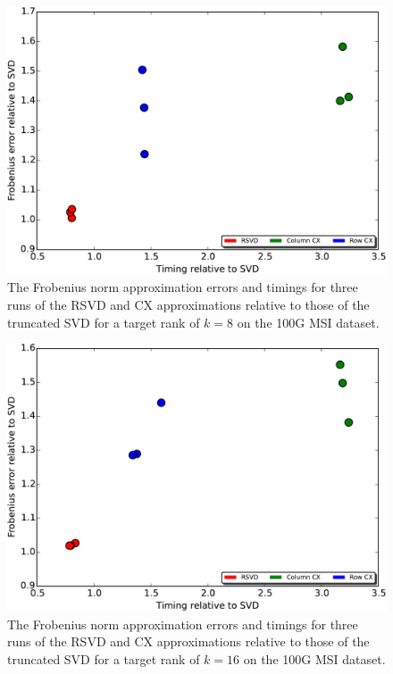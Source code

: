   \begin{figure}[h!btp]
    \begin{centering}
      \includegraphics[scale=0.4]{images/timing-accuracy-8}
      \end{centering}
      \caption{The Frobenius norm approximation errors and timings for three runs of the RSVD and CX approximations relative to those of the truncated SVD for a target rank of $k=8$ on the 100G MSI dataset.}
    \label{fig:timing-accuracy-8}
  \end{figure}

  \begin{figure}[h!btp]
    \begin{centering}
      \includegraphics[scale=0.4]{images/timing-accuracy-16}
      \end{centering}
      \caption{The Frobenius norm approximation errors and timings for three runs of the RSVD and CX approximations relative to those of the truncated SVD for a target rank of $k=16$ on the 100G MSI dataset.}
    \label{fig:timing-accuracy-16}
  \end{figure}

